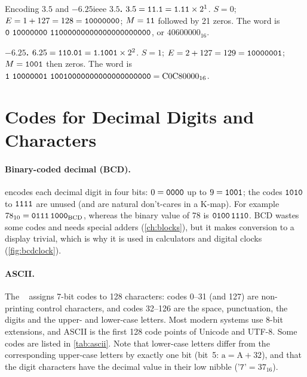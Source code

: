 
\begin{example}{Encoding $3.5$ and $-6.25$}{ieee}
\textbf{$3.5$.} $3.5=\mathtt{11.1}=\mathtt{1.11}\times2^1$. $S=0$; $E=1+127=128=\mathtt{10000000}$; $M=\mathtt{11}$ followed by 21 zeros. The word is $\bin{0\ 10000000\ 11000000000000000000000}$, or $\mathrm{40600000}_{16}$.

\textbf{$-6.25$.} $6.25=\mathtt{110.01}=\mathtt{1.1001}\times2^2$. $S=1$; $E=2+127=129=\mathtt{10000001}$; $M=\mathtt{1001}$ then zeros. The word is $\bin{1\ 10000001\ 10010000000000000000000}=\mathrm{C0C80000}_{16}$.
\end{example}

\section{Codes for Decimal Digits and Characters}\label{sec:codes}
\paragraph{Binary-coded decimal (BCD).}  encodes each decimal digit in four bits: $0=\mathtt{0000}$ up to $9=\mathtt{1001}$; the codes $\mathtt{1010}$ to $\mathtt{1111}$ are unused (and are natural don't-cares in a K-map). For example $78_{10}=\mathtt{0111\,1000}_{\mathrm{BCD}}$, whereas the binary value of 78 is $\mathtt{0100\,1110}$. BCD wastes some codes and needs special adders (\cref{ch:blocks}), but it makes conversion to a display trivial, which is why it is used in calculators and digital clocks (\cref{fig:bcdclock}).


\paragraph{ASCII.} The ~\cite{ansix34} assigns 7-bit codes to 128 characters: codes 0--31 (and 127) are non-printing control characters, and codes 32--126 are the space, punctuation, the digits and the upper- and lower-case letters. Most modern systems use 8-bit extensions, and ASCII is the first 128 code points of Unicode and UTF-8. Some codes are listed in \cref{tab:ascii}. Note that lower-case letters differ from the corresponding upper-case letters by exactly one bit (bit~5: $\mathrm{a}=\mathrm{A}+32$), and that the digit characters have the decimal value in their low nibble ($\texttt{'7'}=\mathrm{37}_{16}$).

